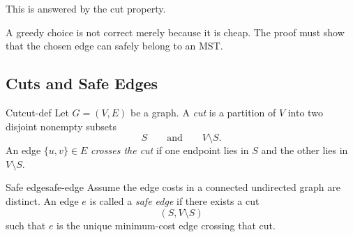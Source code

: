 This is answered by the cut property.

\begin{examtip}[title={Greedy algorithms need proof}]
A greedy choice is not correct merely because it is cheap. The proof must show that the chosen edge can safely belong to an MST.
\end{examtip}

\subsection{Cuts and Safe Edges}

\begin{definition}{Cut}{cut-def}
Let \(G=(V,E)\) be a graph. A \emph{cut} is a partition of \(V\) into two disjoint nonempty subsets
\[
S
\qquad\text{and}\qquad
V\setminus S.
\]
An edge \(\{u,v\}\in E\) \emph{crosses the cut} if one endpoint lies in \(S\) and the other lies in \(V\setminus S\).
\end{definition}

\begin{center}
\end{center}

\begin{definition}{Safe edge}{safe-edge}
Assume the edge costs in a connected undirected graph are distinct. An edge \(e\) is called a \emph{safe edge} if there exists a cut
\[
(S,V\setminus S)
\]
such that \(e\) is the unique minimum-cost edge crossing that cut.
\end{definition}

